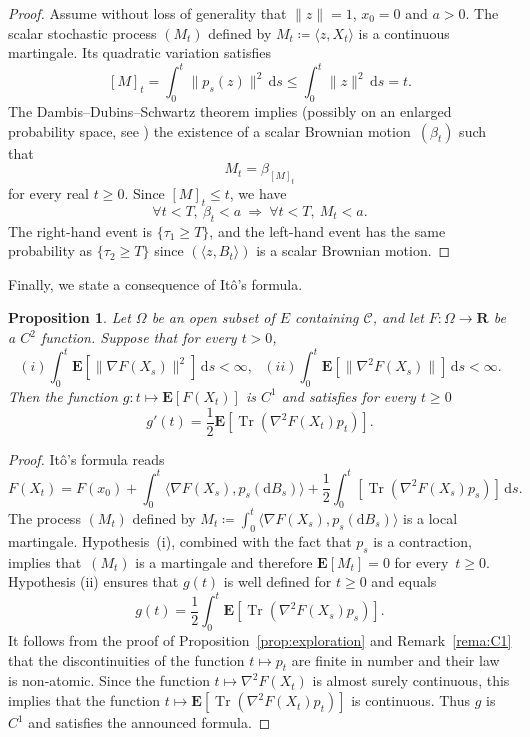 \documentclass[12pt]{amsart}
\newcommand{\R}{\mathbf{R}}
\newcommand{\E}{\mathbf{E}}
\newcommand{\iy}{\infty}
\DeclareMathOperator{\tr}{Tr}
\newcommand{\scalar}[2]{\langle #1 , #2\rangle}
\renewcommand{\leq}{\leqslant}
\renewcommand{\geq}{\geqslant}
\theoremstyle{plain}
\newtheorem{proposition}{Proposition}
\theoremstyle{remark}
\begin{document}
\begin{proof}
Assume without loss of generality that $\|z\|=1$, $x_0=0$ and $a>0$. The scalar stochastic process $(M_t)$ defined by $M_t \coloneqq \scalar{z}{X_t}$ is a continuous martingale. Its quadratic variation satisfies
\[ [M]_t = \int_0^t \|p_s(z)\|^2 \, \mathrm{d}s \leq
\int_0^t \|z\|^2 \, \mathrm{d}s = t .\]
The Dambis--Dubins--Schwartz theorem implies (possibly on an enlarged probability space, see \cite[Theorem 5.5]{LeGall13}) the existence of a scalar Brownian motion~$(\beta_t)$ such that
\[ M_{t} = \beta_{[M]_t}\]
for every real $t \geq 0$. Since $[M]_t \leq t$, we have
\[ \forall t < T,\ \beta_{t} < a \ \Longrightarrow \ \forall t < T, \  M_t < a . \]
The right-hand event is $\{\tau_1 \geq T\}$, and the left-hand event has the same probability as $\{\tau_2 \geq T\}$ since $(\scalar{z}{B_t})$ is a scalar Brownian motion.
\end{proof}
 
Finally, we state a consequence of It\^o's formula.
 
\begin{proposition} \label{prop:Ito}
Let $\Omega$ be an open subset of $E$ containing $\mathscr{C}$, and let $F \colon  \Omega \to \R$ be a $C^2$ function.
Suppose that for every $t>0$,
\[ (i) \int_0^t \E[ \|\nabla F(X_s)\|^2] \, \mathrm{d}s < \iy,
 \ \ \
 (ii) \int_0^t \E[ \|\nabla^2 F(X_s)\|] \, \mathrm{d}s < \iy.
\]
Then the function $g : t \mapsto \E [F(X_t)]$ is $C^1$ and satisfies for every $t \geq 0$
\[ g'(t) = \frac{1}{2} \E \left[ \tr
(\nabla^2F(X_t) p_t ) \right]. \]
\end{proposition}
 
\begin{proof}
It\^o's formula reads
\[ F(X_t) = F(x_0) + \int_0^t \scalar{\nabla F(X_s)}{p_s(\mathrm{d} B_s)} + \frac{1}{2} \int_0^t \left[ \tr (\nabla^2F(X_s) p_s )\right] \, \mathrm{d}s .\]
The process $(M_t)$ defined by $M_t \coloneqq \int_0^t \scalar{\nabla F(X_s)}{p_s(\mathrm{d} B_s)}$ is a local martingale. Hypothesis~(i), combined with the fact that $p_s$ is a contraction, implies that~$(M_t)$ is a martingale and therefore $\E[ M_t ] = 0$ for every~$t \geq 0$. Hypothesis (ii) ensures that $g(t)$ is well defined for $t \geq 0$ and equals
\[g(t) =  \frac{1}{2} \int_0^t \E \left[ \tr
(\nabla^2F(X_s) p_s ) \right]. \]
It follows from the proof of Proposition~\ref{prop:exploration} and Remark~\ref{rema:C1} that the discontinuities of the function $t \mapsto p_t$ are finite in number and their law is non-atomic. Since the function $t \mapsto \nabla^2 F (X_t)$ is almost surely continuous, this implies that the function $t \mapsto \E \left[ \tr
(\nabla^2F(X_t) p_t ) \right]$ is continuous. Thus $g$ is $C^1$ and satisfies the announced formula.
\end{proof}
 
\end{document}

